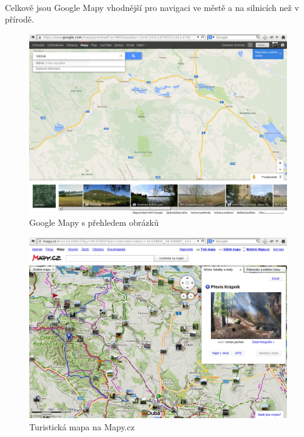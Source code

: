 \documentclass[11pt,a4paper,titlepage,oneside]{book}
\begin{document}
		\paragraph{}Celkově jsou Google Mapy vhodnější pro navigaci ve městě a na silnicích než v přírodě.

		\begin{figure}[!h]
			\begin{center}
				\includegraphics[width=12cm]{obrazky/googleMaps.png}
				\caption{Google Mapy s přehledem obrázků}
			\end{center}
		\end{figure}

			\begin{figure}[!h]
				\begin{center}
					\includegraphics[width=12cm]{obrazky/mapycz.png}
					\caption{Turistická mapa na Mapy.cz}
				\end{center}
			\end{figure}
\end{document}
